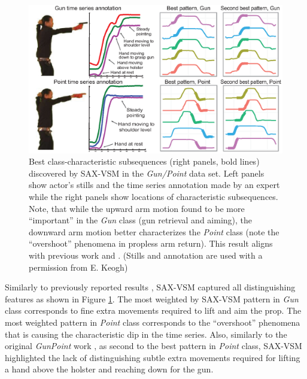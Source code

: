 \begin{figure}[t]
   \centering
   \includegraphics[width=130mm]{figures/gun-point.eps}
   \caption[Best class-characteristic subsequences (right panels, bold lines) discovered by SAX-VSM in
   the \textit{Gun/Point} data set.]{Best class-characteristic subsequences (right panels, bold lines) discovered by SAX-VSM in
   the \textit{Gun/Point} data set. 
   Left panels show actor's stills and the time series annotation made by an expert while the right panels 
   show locations of characteristic subsequences.
   Note, that while the upward arm motion found to be more ``important'' in the \textit{Gun} class 
   (gun retrieval and aiming), the downward arm motion better characterizes the \textit{Point} class 
   (note the ``overshoot'' phenomena in propless arm return). 
   This result aligns with previous work \cite{citeulike:7344347} and \cite{citeulike:11345338}.
   (Stills and annotation are used with a permission from E. Keogh) }
   \label{fig:shapelet-like-patterns}
\end{figure}

Similarly to previously reported results \cite{citeulike:7344347} \cite{citeulike:11345338}, 
SAX-VSM captured all distinguishing features as shown in Figure \ref{fig:shapelet-like-patterns}. 
The most weighted by SAX-VSM pattern in \textit{Gun} class corresponds to fine extra movements required to 
lift and aim the prop. 
The most weighted pattern in \textit{Point} class corresponds to the ``overshoot'' phenomena that is causing the 
characteristic dip in the time series. 
Also, similarly to the original \textit{GunPoint} work \cite{Ratanamahatana04makingtime-series}, as second to the best 
pattern in \textit{Point} class, SAX-VSM highlighted the lack of distinguishing subtle extra movements required
for lifting a hand above the holster and reaching down for the gun.

